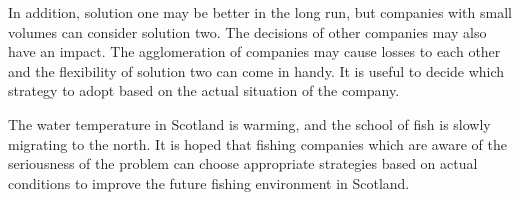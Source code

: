 \documentclass{mcmthesis}
\numberwithin{figure}{section}
\numberwithin{table}{section}
\begin{document}
In addition, solution one may be better in the long run, but companies with small volumes can consider solution two. The decisions of other companies may also have an impact. The agglomeration of companies may cause losses to each other and the flexibility of solution two can come in handy. It is useful to decide which strategy to adopt based on the actual situation of the company.

The water temperature in Scotland is warming, and the school of fish is slowly migrating to the north. It is hoped that fishing companies which are aware of the seriousness of the problem can choose appropriate strategies based on actual conditions to improve the future fishing environment in Scotland.

\newpage
{}


\end{document}
